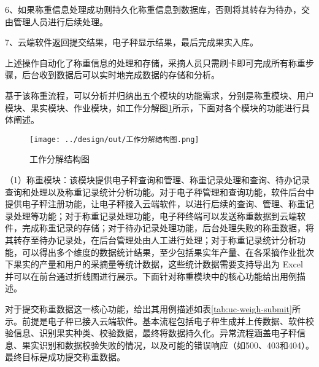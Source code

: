 6、如果称重信息处理成功则持久化称重信息到数据库，否则将其转存为待办，交由管理人员进行后续处理。

7、云端软件返回提交结果，电子秤显示结果，最后完成果实入库。

上述操作自动化了称重信息的处理和存储，采摘人员只需刷卡即可完成所有称重步骤，后台收到数据后可以实时地完成数据的存储和分析。

基于该称重流程，可以分析并归纳出五个模块的功能需求，分别是称重模块、用户模块、果实模块、作业模块，如工作分解图\ref{fig:工作分解结构图}所示，下面对各个模块的功能进行具体阐述。

\begin{figure}
    \centering
    \texttt{[image: ../design/out/工作分解结构图.png]}
    \caption{工作分解结构图}
    \label{fig:工作分解结构图}
\end{figure}

（1）称重模块：该模块提供电子秤查询和管理、称重记录处理和查询、待办记录查询和处理以及称重记录统计分析功能。对于电子秤管理和查询功能，软件后台中提供电子秤注册功能，让电子秤接入云端软件，以进行后续的查询、管理、称重记录处理等功能；对于称重记录处理功能，电子秤终端可以发送称重数据到云端软件，完成称重记录的存储；对于待办记录处理功能，后台处理失败的称重数据，将其转存至待办记录处，在后台管理处由人工进行处理；对于称重记录统计分析功能，可以得出多个维度的数据统计结果，至少包括果实年产量、在各采摘作业批次下果实的产量和用户的采摘量等统计数据，这些统计数据需要支持导出为 Excel 并可以在前台通过折线图进行展示。下面针对称重模块中的核心功能给出用例描述。

对于提交称重数据这一核心功能，给出其用例描述如表\ref{tab:uc-weigh-submit}所示。前提是电子秤已接入云端软件。基本流程包括电子秤生成并上传数据、软件校验信息、识别果实种类、校验数据，最终将数据持久化。异常流程涵盖电子秤信息、果实识别和数据校验失败的情况，以及可能的错误响应（如500、403和404）。最终目标是成功提交称重数据。


